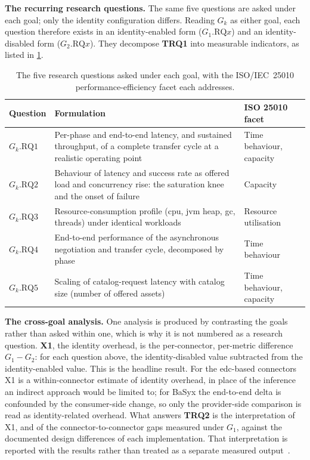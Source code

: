 \textbf{The recurring research questions.} The same five questions are asked under each goal; only the identity configuration differs. Reading $G_k$ as either goal, each question therefore exists in an identity-enabled form ($G_1.\text{RQ}x$) and an identity-disabled form ($G_2.\text{RQ}x$). They decompose \textbf{TRQ1} into measurable indicators, as listed in \cref{tab:research-questions}.

\begin{table}[htbp]
    \centering
    \small
    \setlength{\tabcolsep}{6pt}
    \begin{tabularx}{\textwidth}{@{}l X l@{}}
        \toprule
        \textbf{Question} & \textbf{Formulation} & \textbf{ISO 25010 facet} \\
        \midrule
        $G_k.\text{RQ}1$ & Per-phase and end-to-end latency, and sustained throughput, of a complete transfer cycle at a realistic operating point & Time behaviour, capacity \\
        $G_k.\text{RQ}2$ & Behaviour of latency and success rate as offered load and concurrency rise: the saturation knee and the onset of failure & Capacity \\
        $G_k.\text{RQ}3$ & Resource-consumption profile (\gls{cpu}, \gls{jvm} heap, \gls{gc}, threads) under identical workloads & Resource utilisation \\
        $G_k.\text{RQ}4$ & End-to-end performance of the asynchronous negotiation and transfer cycle, decomposed by phase & Time behaviour \\
        $G_k.\text{RQ}5$ & Scaling of catalog-request latency with catalog size (number of offered assets) & Time behaviour, capacity \\
        \bottomrule
    \end{tabularx}
    \caption[Recurring research questions per goal]{The five research questions asked under each goal, with the ISO/IEC~25010 performance-efficiency facet each addresses.}
    \label{tab:research-questions}
\end{table}

\newpage

\textbf{The cross-goal analysis.} One analysis is produced by contrasting the goals rather than asked within one, which is why it is not numbered as a research question. \textbf{X1}, the identity overhead, is the per-connector, per-metric difference $G_1 - G_2$: for each question above, the identity-disabled value subtracted from the identity-enabled value. This is the headline result. For the \gls{edc}-based connectors X1 is a within-connector estimate of identity overhead, in place of the inference an indirect approach would be limited to; for BaSyx the end-to-end delta is confounded by the consumer-side change, so only the provider-side comparison is read as identity-related overhead. What answers \textbf{TRQ2} is the interpretation of X1, and of the connector-to-connector gaps measured under $G_1$, against the documented design differences of each implementation. That interpretation is reported with the results rather than treated as a separate measured output~\citep{evaluatingtheperformanceimpactofdatasovereignty, eclipseEdcIdentityHub}.


